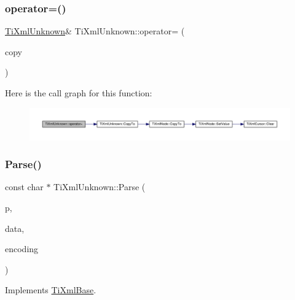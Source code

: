 \subsubsection{\texorpdfstring{operator=()}{operator=()}}
{\footnotesize\ttfamily \hyperlink{class_ti_xml_unknown}{Ti\+Xml\+Unknown}\& Ti\+Xml\+Unknown\+::operator= (\begin{DoxyParamCaption}\item[{const \hyperlink{class_ti_xml_unknown}{Ti\+Xml\+Unknown} \&}]{copy }\end{DoxyParamCaption})\hspace{0.3cm}{\ttfamily [inline]}}

Here is the call graph for this function\+:
\nopagebreak
\begin{figure}[H]
\begin{center}
\leavevmode
\includegraphics[width=350pt]{class_ti_xml_unknown_a60560b5aacb4bdc8b2b5f02f0a99c5c0_cgraph}
\end{center}
\end{figure}
\mbox{\label{class_ti_xml_unknown_aa51c2694e4177b5f0b5429ee5a81b58d}} 
\subsubsection{\texorpdfstring{Parse()}{Parse()}}
{\footnotesize\ttfamily const char $\ast$ Ti\+Xml\+Unknown\+::\+Parse (\begin{DoxyParamCaption}\item[{const char $\ast$}]{p,  }\item[{\hyperlink{class_ti_xml_parsing_data}{Ti\+Xml\+Parsing\+Data} $\ast$}]{data,  }\item[{\hyperlink{tinyxml_8h_a88d51847a13ee0f4b4d320d03d2c4d96}{Ti\+Xml\+Encoding}}]{encoding }\end{DoxyParamCaption})\hspace{0.3cm}{\ttfamily [virtual]}}



Implements \hyperlink{class_ti_xml_base_a00e4edb0219d00a1379c856e5a1d2025}{Ti\+Xml\+Base}.

